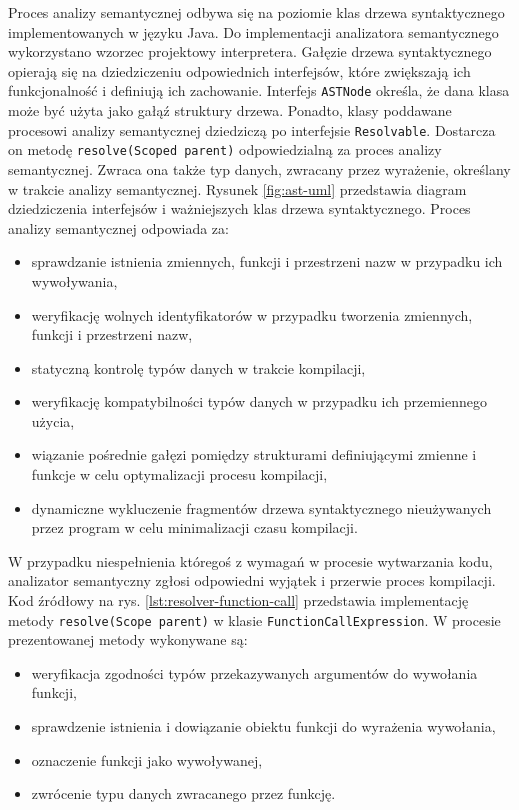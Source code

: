 Proces analizy semantycznej odbywa się na poziomie klas drzewa syntaktycznego implementowanych w języku Java. Do implementacji analizatora semantycznego wykorzystano wzorzec projektowy interpretera. Gałęzie drzewa syntaktycznego opierają się na dziedziczeniu odpowiednich interfejsów, które zwiększają ich funkcjonalność i definiują ich zachowanie. Interfejs \lstinline|ASTNode| określa, że dana klasa może być użyta jako gałąź struktury drzewa. Ponadto, klasy poddawane procesowi analizy semantycznej dziedziczą po interfejsie \lstinline|Resolvable|. Dostarcza on metodę \lstinline|resolve(Scoped parent)| odpowiedzialną za proces analizy semantycznej. Zwraca ona także typ danych, zwracany przez wyrażenie, określany w trakcie analizy semantycznej. Rysunek \ref{fig:ast-uml} przedstawia diagram dziedziczenia interfejsów i ważniejszych klas drzewa syntaktycznego. Proces analizy semantycznej odpowiada za:
\begin{itemize}
\item sprawdzanie istnienia zmiennych, funkcji i przestrzeni nazw w przypadku ich wywoływania,
\item weryfikację wolnych identyfikatorów w przypadku tworzenia zmiennych, funkcji i przestrzeni nazw,
\item statyczną kontrolę typów danych w trakcie kompilacji,
\item weryfikację kompatybilności typów danych w przypadku ich przemiennego użycia,
\item wiązanie pośrednie gałęzi pomiędzy strukturami definiującymi zmienne i funkcje w celu optymalizacji procesu kompilacji,
\item dynamiczne wykluczenie fragmentów drzewa syntaktycznego nieużywanych przez program w celu minimalizacji czasu kompilacji.
\end{itemize}
W przypadku niespełnienia któregoś z wymagań w procesie wytwarzania kodu, analizator semantyczny zgłosi odpowiedni wyjątek i przerwie proces kompilacji. Kod źródłowy na rys.  \ref{lst:resolver-function-call} przedstawia implementację metody \lstinline|resolve(Scope parent)| w klasie \mbox{\lstinline|FunctionCallExpression|.} W procesie prezentowanej metody wykonywane są:
\begin{itemize}
\item weryfikacja zgodności typów przekazywanych argumentów do wywołania funkcji,
\item sprawdzenie istnienia i dowiązanie obiektu funkcji do wyrażenia wywołania,
\item oznaczenie funkcji jako wywoływanej,
\item zwrócenie typu danych zwracanego przez funkcję.
\end{itemize}
